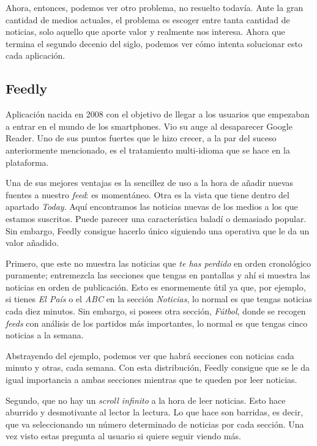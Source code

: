 Ahora, entonces, podemos ver otro problema, no resuelto todavía. Ante la gran cantidad de medios actuales, el problema es escoger entre tanta cantidad de noticias, solo aquello que aporte valor y realmente nos interesa. Ahora que termina el segundo decenio del siglo, podemos ver cómo intenta solucionar esto cada aplicación.

\subsection{Feedly}

Aplicación nacida en 2008 con el objetivo de llegar a los usuarios que empezaban a entrar en el mundo de los smartphones. Vio su auge al desaparecer Google Reader. Uno de sus puntos fuertes que le hizo crecer, a la par del suceso anteriormente mencionado, es el tratamiento multi-idioma que se hace en la plataforma.

Una de sus mejores ventajas es la sencillez de uso a la hora de añadir nuevas fuentes a nuestro \textit{feed}: es momentáneo. Otra es la vista que tiene dentro del apartado \textit{Today}. Aquí encontramos las noticias nuevas de los medios a los que estamos suscritos. Puede parecer una característica baladí o demasiado popular. Sin embargo, Feedly consigue hacerlo único siguiendo una  operativa que le da un valor añadido.

Primero, que este no muestra las noticias que \textit{te has perdido} en orden cronológico puramente; entremezcla las secciones que tengas en pantallas y ahí si muestra las noticias en orden de publicación. Esto es enormemente útil ya que, por ejemplo, si tienes \textit{El País} o el \textit{ABC} en la sección \textit{Noticias}, lo normal es que tengas noticias cada diez minutos. Sin embargo, si posees otra sección, \textit{Fútbol}, donde se recogen \textit{feeds} con análisis de los partidos más importantes, lo normal es que tengas cinco noticias a la semana.

Abstrayendo del ejemplo, podemos ver que habrá secciones con noticias cada minuto y otras, cada semana. Con esta distribución, Feedly consigue que se le da igual importancia a ambas secciones mientras que te queden por leer noticias.

Segundo, que no hay un \textit{scroll infinito} a la hora de leer noticias. Esto hace aburrido y desmotivante al lector la lectura. Lo que hace son barridas, es decir, que va seleccionando un número determinado de noticias por cada sección. Una vez visto estas pregunta al usuario si quiere seguir viendo más.

